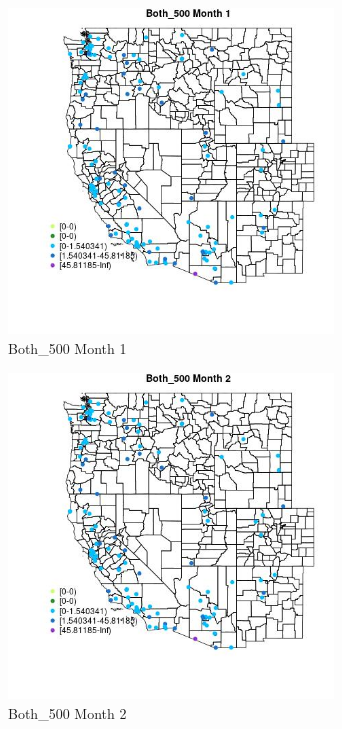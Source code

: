 \begin{figure} 
\centering  
\includegraphics[width=0.77\textwidth]{Code_Outputs/Report_ML_input_PM25_Step4_part_e_de_duplicated_aves_MapObsMo1Both_500.jpg} 
\caption{\label{fig:Report_ML_input_PM25_Step4_part_e_de_duplicated_avesMapObsMo1Both_500}Both_500 Month 1} 
\end{figure} 
 

\clearpage 

\begin{figure} 
\centering  
\includegraphics[width=0.77\textwidth]{Code_Outputs/Report_ML_input_PM25_Step4_part_e_de_duplicated_aves_MapObsMo2Both_500.jpg} 
\caption{\label{fig:Report_ML_input_PM25_Step4_part_e_de_duplicated_avesMapObsMo2Both_500}Both_500 Month 2} 
\end{figure} 
 

